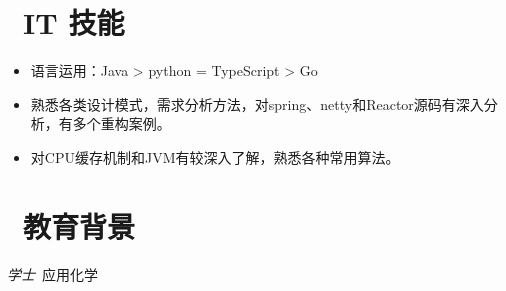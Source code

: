 \documentclass{resume}
\begin{document}



\section{\faCogs\ IT 技能}
\begin{itemize}[parsep=0.5ex]
  \item 语言运用：Java > python = TypeScript > Go
  \item 熟悉各类设计模式，需求分析方法，对spring、netty和Reactor源码有深入分析，有多个重构案例。
  \item 对CPU缓存机制和JVM有较深入了解，熟悉各种常用算法。
\end{itemize}

\section{\faGraduationCap\  教育背景}
\textit{学士}\ 应用化学

\end{document}
